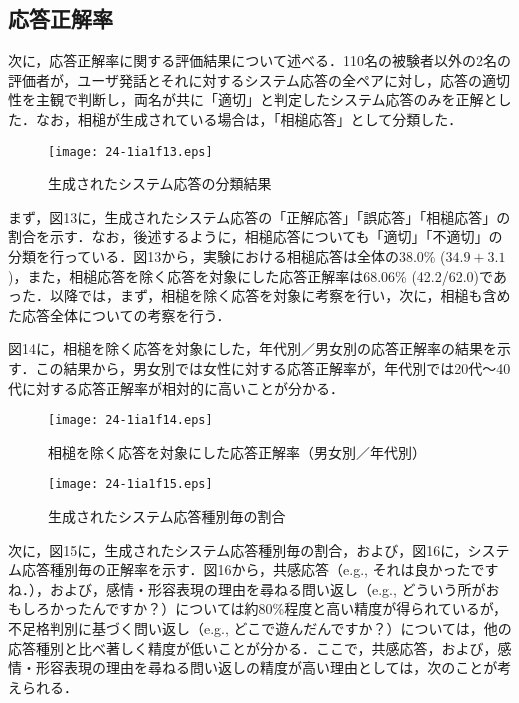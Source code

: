 \documentclass[japanese]{jnlp_1.4}
\begin{document}
\subsection{応答正解率}

次に，応答正解率に関する評価結果について述べる．110名の被験者以外の2名の評価者が，ユーザ発話とそれに対するシステム応答の全ペアに対し，応答の適切性を主観で判断し，両名が共に「適切」と判定したシステム応答のみを正解とした．なお，相槌が生成されている場合は，「相槌応答」として分類した．

\begin{figure}[b]
\begin{center}
\texttt{[image: 24-1ia1f13.eps]}
\end{center}
\caption{生成されたシステム応答の分類結果}
\label{fig:13}
\end{figure}

まず，図13に，生成されたシステム応答の「正解応答」「誤応答」「相槌応答」の割合を示す．なお，後述するように，相槌応答についても「適切」「不適切」の分類を行っている．図13から，実験における相槌応答は全体の38.0\% ($34.9 + 3.1$)，また，相槌応答を除く応答を対象にした応答正解率は68.06\% (42.2/62.0)であった．以降では，まず，相槌を除く応答を対象に考察を行い，次に，相槌も含めた応答全体についての考察を行う．

図14に，相槌を除く応答を対象にした，年代別／男女別の応答正解率の結果を示す．この結果から，男女別では女性に対する応答正解率が，年代別では20代〜40代に対する応答正解率が相対的に高いことが分かる．

\begin{figure}[b]
\begin{center}
\texttt{[image: 24-1ia1f14.eps]}
\end{center}
\caption{相槌を除く応答を対象にした応答正解率（男女別／年代別）}
\label{fig:14}
\end{figure}
\begin{figure}[b]
\begin{center}
\texttt{[image: 24-1ia1f15.eps]}
\end{center}
\caption{生成されたシステム応答種別毎の割合}
\label{fig:15}
\end{figure}


次に，図15に，生成されたシステム応答種別毎の割合，および，図16に，システム応答種別毎の正解率を示す．図16から，共感応答（e.g., それは良かったですね．），および，感情・形容表現の理由を尋ねる問い返し（e.g., どういう所がおもしろかったんですか？）については約80\%程度と高い精度が得られているが，不足格判別に基づく問い返し（e.g., どこで遊んだんですか？）については，他の応答種別と比べ著しく精度が低いことが分かる．ここで，共感応答，および，感情・形容表現の理由を尋ねる問い返しの精度が高い理由としては，次のことが考えられる．
\end{document}

